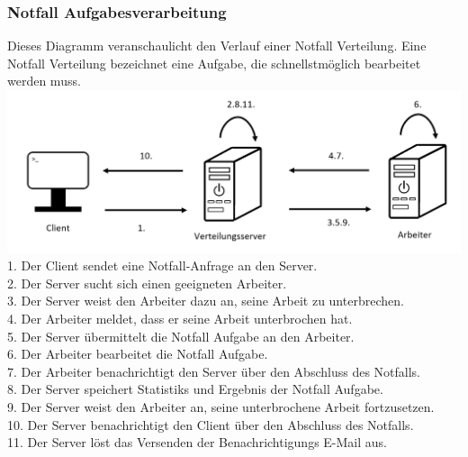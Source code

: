 \documentclass[a4paper,12pt]{article}
\begin{document}
\subsubsection{Notfall \glspl{Aufgabe}verarbeitung}
Dieses Diagramm veranschaulicht den Verlauf einer Notfall Verteilung. Eine Notfall Verteilung bezeichnet eine \gls{Aufgabe}, die schnellstmöglich bearbeitet werden muss.\\
\includegraphics[width=\linewidth]{Systemmodelle/Models/Emergency-Scheduling.PNG}
\\
1. Der \gls{Client} sendet eine Notfall-Anfrage an den \gls{Server}.\\
2. Der \gls{Server} sucht sich einen geeigneten \gls{Arbeiter}.\\
3. Der \gls{Server} weist den \gls{Arbeiter} dazu an, seine Arbeit zu unterbrechen.\\
4. Der \gls{Arbeiter} meldet, dass er seine Arbeit unterbrochen hat.\\
5. Der \gls{Server} übermittelt die Notfall \gls{Aufgabe} an den \gls{Arbeiter}.\\
6. Der \gls{Arbeiter} bearbeitet die Notfall \gls{Aufgabe}.\\
7. Der \gls{Arbeiter} benachrichtigt den \gls{Server} über den Abschluss des Notfalls.\\
8. Der \gls{Server} speichert \glspl{Statistik} und Ergebnis der Notfall \gls{Aufgabe}.\\
9. Der \gls{Server} weist den \gls{Arbeiter} an, seine unterbrochene Arbeit fortzusetzen.\\
10. Der \gls{Server} benachrichtigt den \gls{Client} über den Abschluss des Notfalls.\\
11. Der \gls{Server} löst das Versenden der Benachrichtigungs E-Mail aus.

\clearpage
\end{document}
